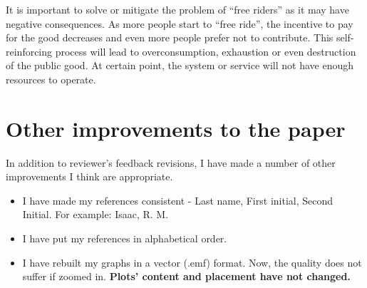 \documentclass{article}
\newenvironment{itpars}
	{\par\itshape}
	{\par}
\begin{document}
\begin{enumerate}
				\begin{itpars}

					It is important to solve or mitigate the problem of “free riders” as it may have negative consequences. As more people start to “free ride”, the incentive to pay for the good decreases and even more people prefer not to contribute. This self-reinforcing process will lead to overconsumption, exhaustion or even destruction of the public good. At certain point, the system or service will not have enough resources to operate.

				\end{itpars}

		\end{enumerate}

	\clearpage

		\section*{Other improvements to the paper}

			In addition to reviewer's feedback revisions, I have made a number of other improvements I think are appropriate.

			\begin{itemize}
				\item 

					I have made my references consistent - Last name, First initial, Second Initial. For example: Isaac, R. M.

				\item

					I have put my references in alphabetical order.

				\item

					I have rebuilt my graphs in a vector (.emf) format. Now, the quality does not suffer if zoomed in. \textbf{Plots' content and placement have not changed.}					

			\end{itemize}
\end{document}

